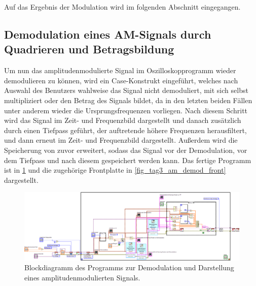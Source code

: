 \documentclass[
a4paper,
12pt,
pagesize,
ngerman
]{scrartcl}
\begin{document}
	Auf das Ergebnis der Modulation wird im folgenden Abschnitt eingegangen.
	

	\subsection{Demodulation eines AM-Signals durch Quadrieren und Betragsbildung} \label{DemodulationAM}
	Um nun das amplitudenmodulierte Signal im Oszilloskopprogramm wieder demodulieren zu können, wird ein Case-Konstrukt eingeführt, welches nach Auswahl des Benutzers wahlweise das Signal nicht demoduliert, mit sich selbst multipliziert oder den Betrag des Signals bildet, da in den letzten beiden Fällen unter anderem wieder die Ursprungsfrequenzen vorliegen.
	Nach diesem Schritt wird das Signal im Zeit- und Frequenzbild dargestellt und danach zusätzlich durch einen Tiefpass geführt, der auftretende höhere Frequenzen herausfiltert, und dann erneut im Zeit- und Frequenzbild dargestellt.
	Außerdem wird die Speicherung von zuvor erweitert, sodass das Signal vor der Demodulation, vor dem Tiefpass und nach diesem gespeichert werden kann.
	Das fertige Programm ist in \cref{fig_tag3_am_demod_block} und die zugehörige Frontplatte in \cref{fig_tag3_am_demod_front} dargestellt.

	\begin{figure}[H]  
		\includegraphics[width=1\textwidth]{EIRE2018Dateien/Tag3/modifizierterOszi/Oszilloskop__modifiziertd}
		\centering
		\caption{
			Blockdiagramm des Programms zur Demodulation und Darstellung eines amplitudenmodulierten Signals.
		}
		\label{fig_tag3_am_demod_block}
		\centering
	\end{figure}
\end{document}
